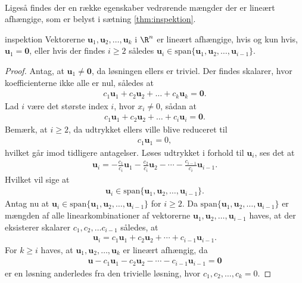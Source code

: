 \\
%
%
Ligeså findes der en række egenskaber vedrørende mængder der er lineært afhængige, som er belyst i sætning \ref{thm:inspektion}.
%
%
\begin{thm}{}{inspektion}
%
Vektorerne $\mathbf{u}_1,\mathbf{u}_2, \ldots ,\mathbf{u}_k$ i $\R^n$ er lineært afhængige, 
hvis og kun hvis, $\mathbf{u}_1=\mathbf{0}$, eller hvis der findes $i \geq 2$ således $\mathbf{u}_i \in \text{span} \{ \mathbf{u}_1,\mathbf{u}_2, \ldots ,\mathbf{u}_{i-1} \}$.
%
\end{thm}
%
%
\begin{proof}
% 
Antag, at $\mathbf{u}_1 \neq \mathbf{0}$, da løsningen ellers er triviel. 
Der findes skalarer, hvor koefficienterne ikke alle er nul, således at
% 
\begin{align*}
c_1 \mathbf{u}_1 + c_2 \mathbf{u}_2 + \ldots + c_k \mathbf{u}_k = \mathbf{0}.
\end{align*}
%
Lad $i$ være det største index $i$, hvor $x_i \neq 0$, sådan at 
\begin{align*}
c_1 \mathbf{u}_1 + c_2 \mathbf{u}_2 + \ldots + c_i \mathbf{u}_i = \mathbf{0}.
\end{align*}
Bemærk, at $i\geq2$, da udtrykket ellers ville blive reduceret til
%
\begin{align*}
c_1\textbf{u}_1=0,
\end{align*}
%
hvilket går imod tidligere antagelser.
Løses udtrykket i forhold til $\mathbf{u}_i$, ses det at
\begin{align*}
\mathbf{u}_i = - \frac{c_1}{c_i} \mathbf{u}_1 - \frac{c_2}{c_i} \mathbf{u}_2 - \cdots - \frac{c_{i-1}}{c_i} \mathbf{u}_{i-1}.
\end{align*}
Hvilket vil sige at 
\begin{align*}
\mathbf{u}_i \in \text{span}\{ \mathbf{u}_1,\mathbf{u}_2, \ldots ,\mathbf{u}_{i-1} \}.
\end{align*}
%
Antag nu at $\mathbf{u}_i \in \text{span}\{ \mathbf{u}_1,\mathbf{u}_2, \ldots ,\mathbf{u}_{i-1} \}$ for $i \geq 2$.
Da $\text{span}\{ \mathbf{u}_1,\mathbf{u}_2, \ldots ,\mathbf{u}_{i-1} \}$ er mængden af alle linearkombinationer af vektorerne $\mathbf{u}_1,\mathbf{u}_2, \ldots ,\mathbf{u}_{i-1}$ haves, at der eksisterer skalarer $c_1, c_2, \ldots c_{i-1}$ således, at
%
\begin{align*}
\textbf{u}_i=c_1\mathbf{u}_1 + c_2 \mathbf{u}_2 + \cdots + c_{i-1}\mathbf{u}_{i-1}.
\end{align*}
%
For $k \geq i$ haves, at $\mathbf{u}_1,\mathbf{u}_2, \ldots ,\mathbf{u}_k$ er lineært afhængig, da 
\begin{align*}
\textbf{u} -c_1\textbf{u}_1 - c_2\textbf{u}_2 - \cdots - c_{i-1}\textbf{u}_{i-1} = \textbf{0}
\end{align*} 
er en løsning anderledes fra den trivielle løsning, hvor $c_1, c_2,\ldots,c_k=0$.
%
\end{proof}
